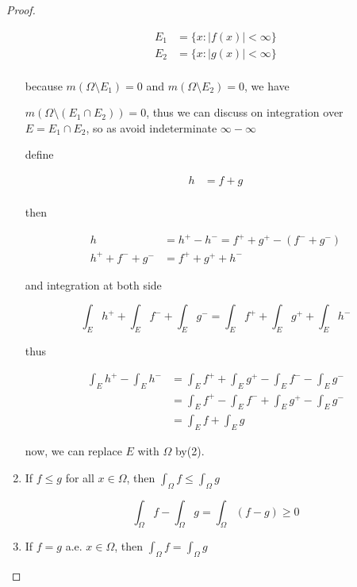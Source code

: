 \begin{proof}
\begin{enumerate}
        \begin{align*}
            E_1 &= \{ x: |f(x)| < \infty\} \\
            E_2 &= \{ x: |g(x)| < \infty\} \\
        \end{align*}

        because $m(\Omega \setminus E_1) = 0$ and $m(\Omega \setminus E_2) = 0$, we have

        $m(\Omega \setminus(E_1 \cap E_2)) = 0$, thus we can discuss on integration over $E = E_1 \cap E_2$, 
        so as avoid indeterminate $\infty - \infty$


        define

        \begin{align*}
            h &= f+ g\\
        \end{align*}

        then

        \begin{align*}
            h &= h^+ - h^- = f^+ + g^+ - (f^- + g^-) \\
            h^+ + f^- + g^- &= f^+ + g^+ + h^- 
        \end{align*}

        and integration at both side

        \[
            \int_{E}h^+ + \int_{E}f^- + \int_{E}g^- = \int_{E}f^+ + \int_{E}g^+ +\int_{E}h^-
        \]

        thus

        \begin{align*}
\int_{E}h^+ - \int_{E}h^- &= \int_{E}f^+ + \int_{E}g^+- \int_{E}f^- - \int_{E}g^- \\
&= \int_{E}f^+ - \int_{E}f^- + \int_{E}g^+ - \int_{E}g^- \\
&= \int_{E}f + \int_{E}g
        \end{align*}

        now, we can replace $E$ with $\Omega$ by(2).
        
        \item If $f \le g$ for all $x \in \Omega$, then $\int_{\Omega}f \le \int_{\Omega} g$

        \[
            \int_{\Omega}f  - \int_{\Omega}g = \int_{\Omega}(f -g) \ge 0
        \]


        \item If $f = g$ a.e. $x \in \Omega$, then $\int_{\Omega}f = \int_{\Omega} g$


\end{enumerate}
\end{proof}
